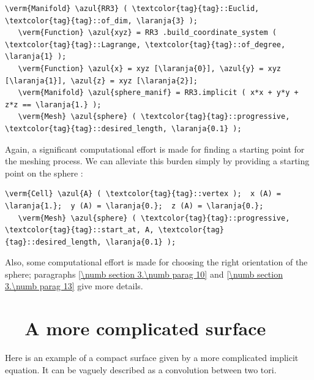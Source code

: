 \begin{Verbatim}[commandchars=\\\{\},formatcom=\small\tt,frame=single,
   label=parag-\ref{\numb section 3.\numb parag 6}.cpp,rulecolor=\color{coment},
   baselinestretch=0.94,framesep=2mm                                            ]
   \verm{Manifold} \azul{RR3} ( \textcolor{tag}{tag}::Euclid, \textcolor{tag}{tag}::of_dim, \laranja{3} );
   \verm{Function} \azul{xyz} = RR3 .build_coordinate_system ( \textcolor{tag}{tag}::Lagrange, \textcolor{tag}{tag}::of_degree, \laranja{1} );
   \verm{Function} \azul{x} = xyz [\laranja{0}], \azul{y} = xyz [\laranja{1}], \azul{z} = xyz [\laranja{2}];
   \verm{Manifold} \azul{sphere_manif} = RR3.implicit ( x*x + y*y + z*z == \laranja{1.} );
   \verm{Mesh} \azul{sphere} ( \textcolor{tag}{tag}::progressive, \textcolor{tag}{tag}::desired_length, \laranja{0.1} );
\end{Verbatim}

Again, a significant computational effort is made for finding a starting point
for the meshing process.
We can alleviate this burden simply by providing a starting point on the sphere :

\begin{Verbatim}[commandchars=\\\{\},formatcom=\small\tt,
   baselinestretch=0.94,framesep=2mm                     ]
   \verm{Cell} \azul{A} ( \textcolor{tag}{tag}::vertex );  x (A) = \laranja{1.};  y (A) = \laranja{0.};  z (A) = \laranja{0.};
   \verm{Mesh} \azul{sphere} ( \textcolor{tag}{tag}::progressive, \textcolor{tag}{tag}::start_at, A, \textcolor{tag}{tag}::desired_length, \laranja{0.1} );
\end{Verbatim}

Also, some computational effort is made for choosing the right orientation of the sphere;
paragraphs \ref{\numb section 3.\numb parag 10} and \ref{\numb section 3.\numb parag 13}
give more details.


\section{~~A more complicated surface}\label{\numb section 3.\numb parag 7}

Here is an example of a compact surface given by a more complicated implicit equation.
It can be vaguely described as a convolution between two tori.


